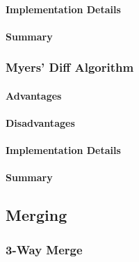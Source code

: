 \paragraph{Implementation Details}

\paragraph{Summary}


\subsubsection{Myers' Diff Algorithm}

\paragraph{Advantages}
\paragraph{Disadvantages}

\paragraph{Implementation Details}

\paragraph{Summary}



\subsection{Merging}


\subsubsection{3-Way Merge}

